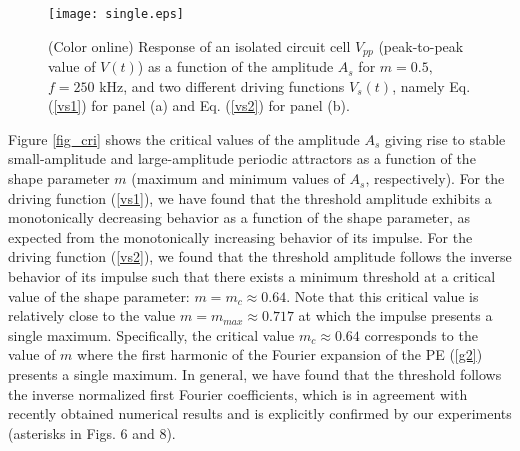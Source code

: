 \documentclass[showpacs,preprintnumbers,10pt,onecolumn]{revtex4}%
\begin{document}
\begin{figure}[h]
\texttt{[image: single.eps]}
\caption{(Color online) Response of an
isolated circuit cell $V_{pp}$ (peak-to-peak value of $V(t)$) as a
function of the amplitude $A_{s}$ for $m=0.5,$ $f=250$ kHz, and two different
driving functions $V_{s}(t)$, namely Eq. (\ref{vs1}) for panel (a) and Eq. (\ref{vs2}) for panel (b).}
\label{single}%
\end{figure}

Figure \ref{fig_cri} shows the critical values of the amplitude
$A_{s}$ giving rise to stable small-amplitude and large-amplitude periodic
attractors as a function of the shape parameter $m$ (maximum and minimum
values of $A_{s}$, respectively). For the driving function (\ref{vs1}), we
have found that the threshold amplitude exhibits a monotonically decreasing behavior
as a function of the shape parameter, as expected from the monotonically
increasing behavior of its impulse. For the driving function (\ref{vs2}), we
found that the threshold amplitude follows the inverse behavior of its impulse
such that there exists a minimum threshold at a critical value of the shape
parameter: $m=m_{c}\approx0.64$. Note that this critical value is relatively close
to the value $m=m_{max}\approx0.717$ at which the impulse presents a single
maximum. Specifically, the critical value $m_{c}\approx0.64$ corresponds to the value of $m$ where the first harmonic of
the Fourier expansion of the PE (\ref{g2}) presents a single maximum.
In general, we have found that the threshold 
follows the inverse normalized 
first Fourier coefficients, 
which is in agreement with recently obtained numerical results \cite{CCP16} and is explicitly confirmed by our experiments (asterisks in Figs. 6 and 8).
\end{document}
